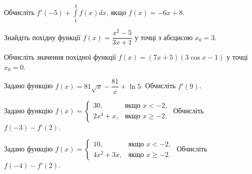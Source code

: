 \documentclass[12pt]{article}
\begin{document}
\begin{samepage}
\noindent\zadnum Обчисліть $f'(-5) + \displaystyle\int\limits_1^4 f(x)dx$, якщо $f(x) = -6x + 8$. 

\nmtnobreak
\nopagebreak\nbvspace{0.5cm}
\nmtAnswerBox
\par{}
\end{samepage}

\begin{samepage}
\noindent\zadnum Знайдіть похідну функції $f(x) = \dfrac{x^2 - 5}{3x + 1}$ у точці з абсцисою $x_0 = 3$. 

\nmtnobreak
\nopagebreak\nbvspace{0.5cm}
\nmtAnswerBox
\par{}
\end{samepage}

\begin{samepage}
\noindent\zadnum Обчисліть значення похідної функції $f(x) = (7x+5)(3\cos x - 1)$ у точці $x_0 = 0$. 

\nmtnobreak
\nopagebreak\nbvspace{0.5cm}
\nmtAnswerBox
\par{}
\end{samepage}

\begin{samepage}
\noindent\zadnum Задано функцію $f(x) = 81\sqrt{x} - \dfrac{81}{x} + \ln 5$. Обчисліть $f'(9)$. 

\nmtnobreak
\nopagebreak\nbvspace{0.5cm}
\nmtAnswerBox
\par{}
\end{samepage}

\begin{samepage}
\noindent\zadnum Задано функцію $f(x) = \begin{cases} 30, & \text{якщо } x < -2, \\ 2x^4 + x, & \text{якщо } x \geqslant -2. \end{cases}$ \quad Обчисліть $f(-3) - f'(2)$. 

\nmtnobreak
\nopagebreak\nbvspace{0.5cm}
\nmtAnswerBox
\par{}
\end{samepage}

\begin{samepage}
\noindent\zadnum Задано функцію $f(x) = \begin{cases} 10, & \text{якщо } x < -2, \\ 4x^2 + 3x, & \text{якщо } x \geqslant -2. \end{cases}$ \quad Обчисліть $f(-4) - f'(2)$. 

\nmtnobreak
\nopagebreak\nbvspace{0.5cm}
\nmtAnswerBox
\par{}
\end{samepage}
\end{document}
